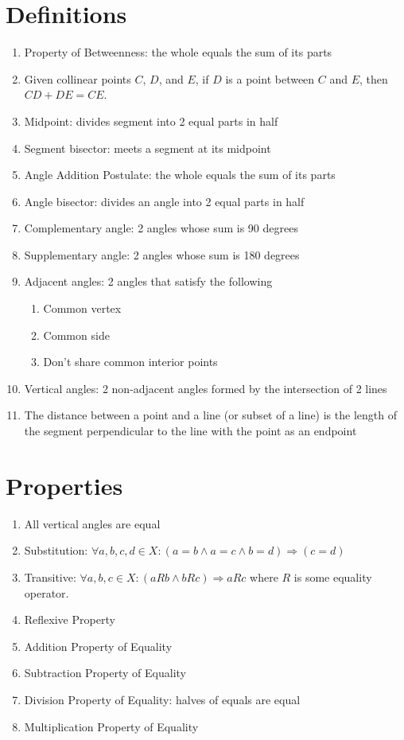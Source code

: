 \documentclass[11pt,letterpaper]{report}
\begin{document}
\section*{Definitions}
\begin{enumerate}
    \item Property of Betweenness: the whole equals the sum of its parts
    \item Given collinear points $C$, $D$, and $E$, if $D$ is a point between $C$ and $E$, then $CD + DE = CE$.
    \item Midpoint: divides segment into 2 equal parts in half
    \item Segment bisector: meets a segment at its midpoint
    \item Angle Addition Postulate: the whole equals the sum of its parts
    \item Angle bisector: divides an angle into 2 equal parts in half
    \item Complementary angle: 2 angles whose sum is 90 degrees
    \item Supplementary angle: 2 angles whose sum is 180 degrees
    \item Adjacent angles: 2 angles that satisfy the following
    \begin{enumerate}
        \item Common vertex
        \item Common side
        \item Don’t share common interior points
    \end{enumerate}
    \item Vertical angles: 2 non-adjacent angles formed by the intersection of 2 lines
    \item The distance between a point and a line (or subset of a line) is the length of the segment perpendicular to the line with the point as an endpoint
\end{enumerate}

\section*{Properties}
\begin{enumerate}
    \item All vertical angles are equal
    \item Substitution: $\forall a,b,c,d\in X:(a=b\wedge a=c\wedge b=d)\Rightarrow (c=d)$
    \item Transitive: $\forall a,b,c\in X:(aRb\wedge bRc)\Rightarrow aRc$ where $R$ is some equality operator.
    \item Reflexive Property
    \item Addition Property of Equality
    \item Subtraction Property of Equality
    \item Division Property of Equality: halves of equals are equal
    \item Multiplication Property of Equality
\end{enumerate}
\end{document}
